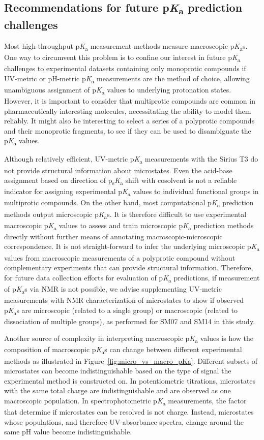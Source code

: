 \documentclass[9pt,lineno]{elife}
\newcommand{\pKa}{p\textit{K}\textsubscript{a}}
\newcommand{\psKa}{p\textsubscript{s}\textit{K}\textsubscript{a}}
\begin{document}
\subsection{Recommendations for future \pKa{} prediction challenges}

Most high-throughput \pKa{} measurement methods measure macroscopic \pKa{}s. 
One way to circumvent this problem is to confine our interest in future \pKa{} challenges to experimental datasets containing only monoprotic compounds if UV-metric or pH-metric \pKa{} measurements are the method of choice, allowing unambiguous assignment of  \pKa{} values to underlying protonation states. 
However, it is important to consider that multiprotic compounds are common in pharmaceutically interesting molecules, necessitating the ability to model them reliably. 
It might also be interesting to select a series of a polyprotic compounds and their monoprotic fragments, to see if they can be used to disambiguate the \pKa{} values.

Although relatively efficient, UV-metric \pKa{} measurements with the Sirius T3 do not provide structural information about microstates. 
Even the acid-base assignment based on direction of \psKa{} shift with cosolvent is not a reliable indicator for assigning experimental \pKa{} values to individual functional groups in multiprotic compounds. 
On the other hand, most computational \pKa{} prediction methods output microscopic \pKa{}s. 
It is therefore difficult to use experimental macroscopic \pKa{} values to assess and train microscopic \pKa{} prediction methods directly without further means of annotating macroscopic-microscopic correspondence. 
It is not straight-forward to infer the underlying microscopic \pKa{} values from macroscopic measurements of a polyprotic compound without complementary experiments that can provide structural information. Therefore, for future data collection efforts for evaluation of \pKa{} predictions, if measurement of \pKa{}s via NMR is not possible, we advise supplementing UV-metric measurements with NMR characterization of microstates to show if observed \pKa{}s are microscopic (related to a single group) or macroscopic (related to dissociation of multiple groups), as performed for SM07 and SM14 in this study. 

Another source of complexity in interpreting macroscopic \pKa{} values is how the composition of macroscopic \pKa{}s can change between different experimental methods as illustrated in Figure~\ref{fig:micro_vs_macro_pKa}. Different subsets of microstates can become indistinguishable based on the type of signal the experimental method is constructed on. In potentiometric titrations, microstates with the same total charge are indistinguishable and are observed as one macroscopic population. In spectrophotometric \pKa{} measurements, the factor that determine if microstates can be resolved is not charge. Instead, microstates whose populations, and therefore UV-absorbance spectra, change around the same pH value become indistinguishable.   
\end{document}
